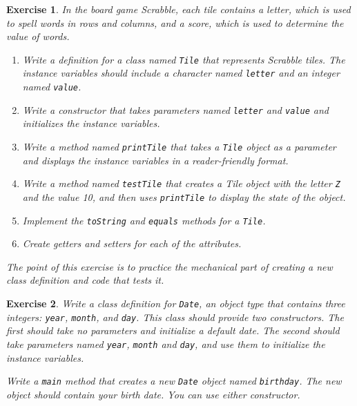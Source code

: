 \documentclass[12pt]{book}
\theoremstyle{exercise}
\newtheorem{exercise}{Exercise}[chapter]
\newcommand{\java}[1]{\verb"#1"}
\begin{document}
\begin{exercise}

In the board game Scrabble, each tile contains a letter, which is used to spell words in rows and columns, and a score, which is used to determine the value of words.

\begin{enumerate}

\item Write a definition for a class named \java{Tile} that represents Scrabble tiles.
The instance variables should include a character named \java{letter} and an integer named \java{value}.

\item Write a constructor that takes parameters named \java{letter} and \java{value} and initializes the instance variables.

\item Write a method named \java{printTile} that takes a \java{Tile} object as a parameter and displays the instance variables in a reader-friendly format.

\item Write a method named \java{testTile} that creates a Tile object with the letter \java{Z} and the value 10, and then uses \java{printTile} to display the state of the object.

\item Implement the \java{toString} and \java{equals} methods for a \java{Tile}.

\item Create getters and setters for each of the attributes.

\end{enumerate}

The point of this exercise is to practice the mechanical part of creating a new class definition and code that tests it.
\end{exercise}


\begin{exercise}
Write a class definition for \java{Date}, an object type that contains three integers: \java{year}, \java{month}, and \java{day}.
This class should provide two constructors.
The first should take no parameters and initialize a default date.
The second should take parameters named \java{year}, \java{month} and \java{day}, and use them to initialize the instance variables.

Write a \java{main} method that creates a new \java{Date} object named \java{birthday}.
The new object should contain your birth date.
You can use either constructor.
\end{exercise}
\end{document}

